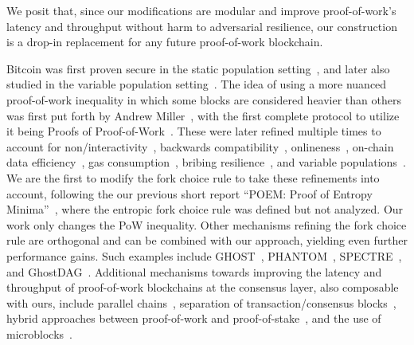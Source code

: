 We posit that, since our modifications are modular and improve proof-of-work's latency and throughput without
harm to adversarial resilience, our construction is a drop-in replacement for any
future proof-of-work blockchain.

\noindent
{}
Bitcoin was first proven secure in the static population setting~\cite{backbone},
and later also studied in the variable population setting~\cite{varbackbone}.
The idea of using a more nuanced proof-of-work inequality in which some blocks
are considered heavier than others was first put forth by Andrew Miller~\cite{highway},
with the first complete protocol to utilize it being
Proofs of Proof-of-Work~\cite{popow}. These were later refined multiple times
to account for non\-/interactivity~\cite{nipopows}, backwards compatibility~\cite{velvet-nipopows},
onlineness~\cite{logspace}, on-chain data efficiency~\cite{compact-superblocks},
gas consumption~\cite{gasefficient-nipopows},
bribing resilience~\cite{soft-power},
and variable populations~\cite{dionyziz}.
We are the first to modify the fork choice rule to take these refinements into
account, following \ifanonymous
the
\else
our
\fi
previous short report ``POEM: Proof of Entropy Minima''~\cite{poem-short},
where the entropic fork choice rule was defined but not analyzed.
Our work only changes the PoW inequality.
Other mechanisms refining the fork choice rule
are orthogonal and can be combined with our approach, yielding even
further performance gains.
Such examples include GHOST~\cite{ghost},
PHANTOM~\cite{phantom}, SPECTRE~\cite{spectre}, and GhostDAG~\cite{ghostdag}.
Additional mechanisms towards improving the latency and throughput
of proof-of-work blockchains at the consensus
layer, also composable with ours, include parallel chains~\cite{parallel-chains},
separation of transaction/consensus blocks~\cite{prism},
hybrid approaches between proof-of-work and proof-of-stake~\cite{byzcoin},
and the use of microblocks~\cite{bitcoin-ng}.